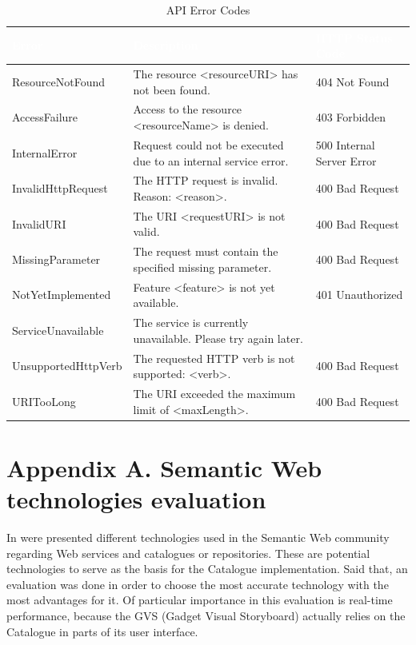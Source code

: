 \documentclass{fast_latex}
\begin{document}
\begin{table}[htb!]
\label{table:error_codes}
\caption{API Error Codes}
\begin{center}
\begin{tabular}{|p{3.5cm}|p{7cm}|p{3cm}|}
\hline
\rowcolor{fast@lightgrey}\textcolor{white}{Error} &
                         \textcolor{white}{Description} &
                         \textcolor{white}{HTTP Status Code}\\ \hline
ResourceNotFound & The resource <resourceURI> has not been found. & 404 Not Found \\ \hline
AccessFailure & Access to the resource <resourceName> is denied. & 403 Forbidden \\ \hline
InternalError & Request could not be executed due to an internal service error. & 500 Internal Server Error \\ \hline
InvalidHttpRequest & The HTTP request is invalid. Reason: <reason>. & 400 Bad Request \\ \hline
InvalidURI & The URI <requestURI> is not valid. & 400 Bad Request \\ \hline
MissingParameter & The request must contain the specified missing parameter. & 400 Bad Request \\ \hline
NotYetImplemented & Feature <feature> is not yet available. & 401 Unauthorized \\ \hline
ServiceUnavailable & The service is currently unavailable. Please try again later. &  \\ \hline
UnsupportedHttpVerb & The requested HTTP verb is not supported: <verb>. & 400 Bad Request \\ \hline
URITooLong & The URI exceeded the maximum limit of <maxLength>. & 400 Bad Request \\ \hline
\end{tabular}
\end{center}
\end{table}


\clearpage




\clearpage
\section*{Appendix A. Semantic Web technologies evaluation}
\label{appendix_a}

In \cite{urmetzer2010fast_state_of_the_art} were presented different technologies used in the Semantic Web community regarding Web services and catalogues or repositories. These are potential technologies to serve as the basis for the Catalogue implementation. Said that, an evaluation was done in order to choose the most accurate technology with the most advantages for it. Of particular importance in this evaluation is real-time performance, because the GVS (Gadget Visual Storyboard) actually relies on the Catalogue in parts of its user interface.
\end{document}

